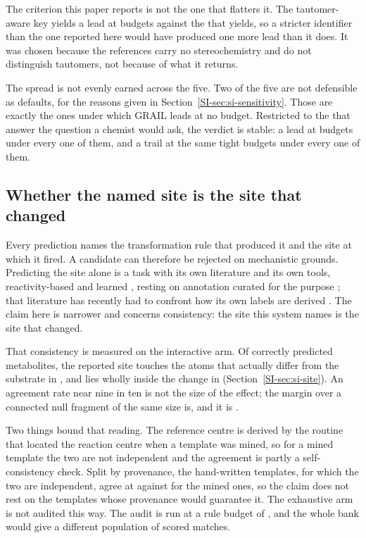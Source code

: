 The criterion this paper reports is not the one that flatters it. The tautomer-aware key yields a
lead at \numCritLeadsDefaultWord{} budgets against the \numCritLeadsBestWord{} that
\numCritLeadsbestname{} yields, so a stricter identifier than the one reported here would have
produced one more lead than it does. It was chosen because the references
carry no stereochemistry and do not distinguish tautomers, not because of what it returns.

The spread is not evenly earned across the five.
Two of the five are not defensible as defaults, for the reasons given in Section~\ref{SI-sec:si-sensitivity}. Those
\numCritLeadsUnderNoIndefensibleWord{} are exactly the ones under which GRAIL leads at no budget.
Restricted to the \numCritDefensibleWord{} that answer the question a chemist would ask, the
verdict is stable: a lead at \numCritLeadsUnderEveryDefensibleWord{} budgets under every one of
them, and a trail at the same \numCritTrailsUnderAnyDefensibleWord{} tight budgets under every one
of them.

\subsection{Whether the named site is the site that changed}
\label{sec:site}

Every prediction names the transformation rule that produced it and the site at which it fired. A
candidate can therefore be rejected on mechanistic grounds. Predicting the
site alone is a task with its own literature and its own tools, reactivity-based
\citep{Rydberg_2010} and learned \citep{Sicho_2019, Jacob_2025_uncertainty}, resting on annotation
curated for the purpose \citep{Mazzolari_2019}; that literature has recently had to confront how
its own labels are derived \citep{Jacob_2025_autosom}. The claim here is narrower and concerns
consistency: the site this system names is the site that changed.

That consistency is measured on the interactive arm.
Of \numSiteScored{} correctly predicted metabolites, the reported site touches the atoms that
actually differ from the substrate in \numSiteTouchingPct{}, and lies wholly inside the change in
\numSiteInsidePct{} (Section~\ref{SI-sec:si-site}). An agreement rate near nine in ten is not the size of the effect; the margin over a connected null fragment of the same size is, and it is \numSiteConnectedmargin{}.

Two things bound that reading. The reference centre is derived by the routine that located the
reaction centre when a template was mined, so for a mined template the two are not independent and
the agreement is partly a self-consistency check. Split by provenance, the hand-written templates, for which the two are independent, agree at \numSiteCuratedPct{} against \numSiteMinedPct{} for the mined ones, so the claim does not rest on the templates whose provenance would guarantee it. The exhaustive arm is not
audited this way. The audit is run at a rule budget of \numSiteRulebudget{}, and the whole bank
would give a different population of scored matches.

